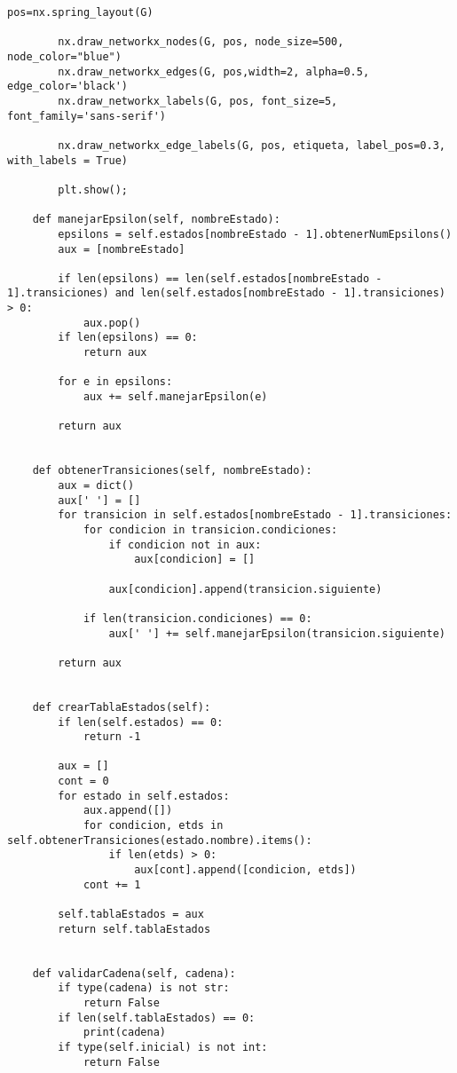 \begin{lstlisting}[frame=single]
        pos=nx.spring_layout(G)

        nx.draw_networkx_nodes(G, pos, node_size=500, node_color="blue")
        nx.draw_networkx_edges(G, pos,width=2, alpha=0.5, edge_color='black')
        nx.draw_networkx_labels(G, pos, font_size=5, font_family='sans-serif')

        nx.draw_networkx_edge_labels(G, pos, etiqueta, label_pos=0.3, with_labels = True)

        plt.show();

    def manejarEpsilon(self, nombreEstado):
        epsilons = self.estados[nombreEstado - 1].obtenerNumEpsilons()
        aux = [nombreEstado]

        if len(epsilons) == len(self.estados[nombreEstado - 1].transiciones) and len(self.estados[nombreEstado - 1].transiciones) > 0:
            aux.pop()
        if len(epsilons) == 0:
            return aux

        for e in epsilons:
            aux += self.manejarEpsilon(e)

        return aux


    def obtenerTransiciones(self, nombreEstado):
        aux = dict()
        aux[' '] = []
        for transicion in self.estados[nombreEstado - 1].transiciones:
            for condicion in transicion.condiciones:
                if condicion not in aux:
                    aux[condicion] = []

                aux[condicion].append(transicion.siguiente)

            if len(transicion.condiciones) == 0:
                aux[' '] += self.manejarEpsilon(transicion.siguiente)

        return aux


    def crearTablaEstados(self):
        if len(self.estados) == 0:
            return -1

        aux = []
        cont = 0
        for estado in self.estados:
            aux.append([])
            for condicion, etds in self.obtenerTransiciones(estado.nombre).items():
                if len(etds) > 0:
                    aux[cont].append([condicion, etds])
            cont += 1

        self.tablaEstados = aux
        return self.tablaEstados


    def validarCadena(self, cadena):
        if type(cadena) is not str:
            return False
        if len(self.tablaEstados) == 0:
            print(cadena)
        if type(self.inicial) is not int:
            return False


\end{lstlisting}
